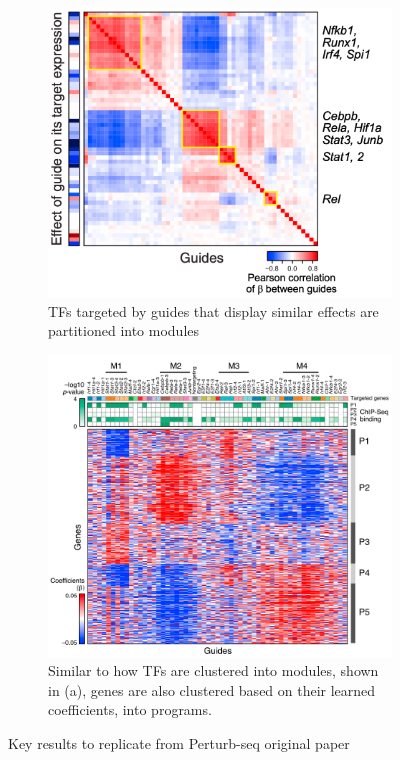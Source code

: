 \documentclass[letterpaper, 11pt]{article}
\begin{document}
\begin{figure}[H]
     \centering
     \begin{subfigure}[b]{0.48\textwidth}
         \centering
         \includegraphics[width=\textwidth]{no_ct_guide_hm.png}
         \caption{TFs targeted by guides that display similar effects are partitioned into modules}
				 \label{guide_clust}
     \end{subfigure}
     \hfill
     \begin{subfigure}[b]{0.48\textwidth}
         \centering
         \includegraphics[width=\textwidth]{guide_exp_hm.png}
         \caption{Similar to how TFs are clustered into modules, shown in (a), genes are also clustered based on their learned coefficients, into programs.}
         \label{guide_exp}
     \end{subfigure}
        \caption{Key results to replicate from Perturb-seq original paper}
        \label{fig:three graphs}
\end{figure}
\end{document}
